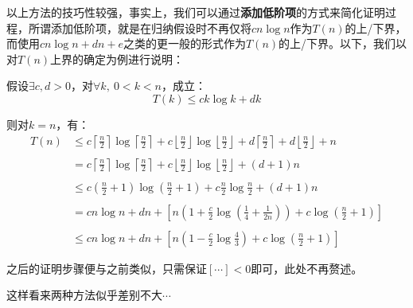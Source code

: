\documentclass[12pt,a4paper,violet]{bbe}
\begin{document}
\begin{solution}[\textbf{（方法2）}]
	以上方法的技巧性较强，事实上，我们可以通过\textbf{添加低阶项}的方式来简化证明过程，所谓添加低阶项，就是在归纳假设时不再仅将$cn\log n$作为$T(n)$的上/下界，而使用$cn\log n+dn+e$之类的更一般的形式作为$T(n)$的上/下界。以下，我们以对$T(n)$上界的确定为例进行说明：
	
	假设$\exists c,d>0$，对$\forall k,~0<k<n$，成立：
	$$
	T(k)\leqslant ck\log k+dk
	$$
	
	则对$k=n$，有：
	$$
	\begin{array}{rl}
	T(n)&\leqslant c\left\lceil\frac{n}{2}\right\rceil\log\left\lceil\frac{n}{2}\right\rceil+c\left\lfloor\frac{n}{2}\right\rfloor\log\left\lfloor\frac{n}{2}\right\rfloor+d\left\lceil\frac{n}{2}\right\rceil+d\left\lfloor\frac{n}{2}\right\rfloor+n\\
	&\\
	&=c\left\lceil\frac{n}{2}\right\rceil\log\left\lceil\frac{n}{2}\right\rceil+c\left\lfloor\frac{n}{2}\right\rfloor\log\left\lfloor\frac{n}{2}\right\rfloor+(d+1)n\\
	&\\
	&\leqslant c(\frac{n}{2}+1)\log(\frac{n}{2}+1)+c\frac{n}{2}\log\frac{n}{2}+(d+1)n\\
	&\\
	&=cn\log n+dn+\left[n(1+\frac{c}{2}\log(\frac{1}{4}+\frac{1}{2n}))+c\log(\frac{n}{2}+1)\right]\\
	&\\
	&\leqslant cn\log n+dn+\left[n(1-\frac{c}{2}\log\frac{4}{3})+c\log(\frac{n}{2}+1)\right]
	\end{array}
	$$
	
	之后的证明步骤便与之前类似，只需保证$[\cdots]<0$即可，此处不再赘述。
\end{solution}
\begin{remark}
	这样看来两种方法似乎差别不大$\cdots$
\end{remark}
\end{document}
